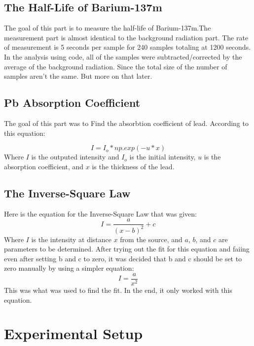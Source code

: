 \documentclass[12pt,letterpaper]{article}
\begin{document}
\subsection{The Half-Life of Barium-137m}

The goal of this part is to measure the half-life of
Barium-137m.The measurement part is almost identical to
the background radiation part. The rate of measurement is
5 seconds per sample for 240 samples totaling at 1200 seconds.
In the analysis 
using code, all of the samples were subtracted/corrected
by the average of the background radiation. Since the
total size of the number of samples aren't the same.
But more on that later.

\subsection{Pb Absorption Coefficient}
The goal of this part was to Find the absorbtion 
coefficient of lead. According to this equation:

\begin{equation}
I = I_o*np.exp(-u*x)
\end{equation}
Where $I$ is the outputed intensity
and $I_o$ is the initial intensity, 
$u$ is the absorption coefficient,
and $x$ is the thickness of the lead.
    
\subsection{The Inverse-Square Law}

Here is the equation for the Inverse-Square Law that
was given: 
\begin{equation}
I = \frac{a}{(x-b)^2} + c
\end{equation}
Where $I$ is the intensity at distance $x$ from the source,
and $a$, $b$, and $c$ are parameters to be determined.
After trying out the fit for this equation and faiing 
even after setting b and c to zero, it was decided that
b and c should be set to zero manually by using
a simpler equation:
\begin{equation}
I = \frac{a}{x^2}
\end{equation}
This was what was used to find the fit. In the end,
it only worked with this equation.

\section{Experimental Setup}
\end{document}
